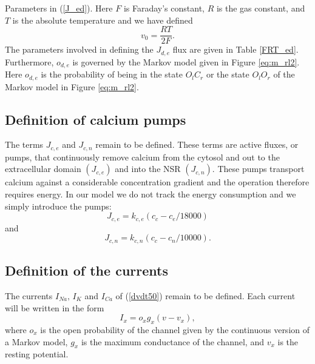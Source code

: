 Parameters in (\ref{J_ed}).\label{FRT_ed}
Here %
$F$ is Faraday's constant, $R$ is the gas constant,
and $T$ is the absolute temperature and we have defined
\[
v_0=\frac{RT}{2F}.
\]
 The parameters involved in defining the $J_{d,e}$ flux are given in Table \ref{FRT_ed}. Furthermore, $o_{d,e}$ is governed by the Markov model
 given in Figure \ref{eq:m_rl2}. Here $o_{d,e}$ is the probability of being in the state $O_lC_r$ or the state $O_lO_r$ of the Markov model
  in Figure \ref{eq:m_rl2}.








\subsection{Definition of calcium pumps}


The terms $J_{c,e}$ and $J_{c,n}$ remain to be defined. These terms are active
fluxes, or pumps, that continuously remove calcium from the cytosol
and out to the extracellular domain $(J_{c,e})$ and into the NSR $(J_{c,n}).$
These pumps transport calcium against a considerable concentration gradient and
the operation therefore requires energy. In our model we do not track the
energy consumption and we simply introduce the pumps:
\begin{equation}
J_{c,e}=k_{c,e} (c_c-c_e/18000)  \label{J_ce}
\end{equation}
and
\begin{equation}
J_{c,n}= k_{c,n} (c_c-c_n/10000).  \label{J_cn}
\end{equation}



\subsection{Definition of the currents}

The currents $I_{Na},\, I_K$ and $I_{Ca}$ of (\ref{dvdt50}) remain to be defined. Each current will be written in the form
\[
I_x=o_x g_x (v-v_x),
\]
where  $o_x$ is the open probability of the channel given by the continuous version of a Markov model, $g_x$ is the maximum conductance of the channel, and $v_x$ is the resting potential.

